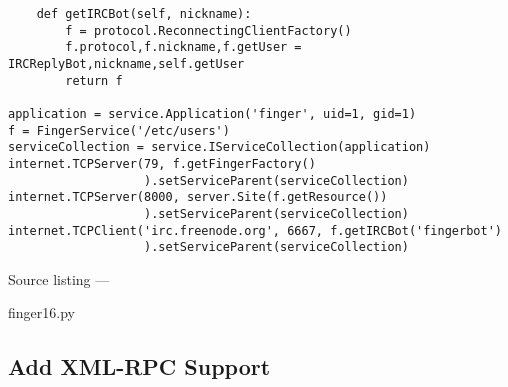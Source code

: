 \begin{verbatim}
    def getIRCBot(self, nickname):
        f = protocol.ReconnectingClientFactory()
        f.protocol,f.nickname,f.getUser = IRCReplyBot,nickname,self.getUser
        return f

application = service.Application('finger', uid=1, gid=1)
f = FingerService('/etc/users')
serviceCollection = service.IServiceCollection(application)
internet.TCPServer(79, f.getFingerFactory()
                   ).setServiceParent(serviceCollection)
internet.TCPServer(8000, server.Site(f.getResource())
                   ).setServiceParent(serviceCollection)
internet.TCPClient('irc.freenode.org', 6667, f.getIRCBot('fingerbot')
                   ).setServiceParent(serviceCollection)
\end{verbatim}\parbox[b]{\linewidth}{\begin{center}Source listing --- \begin{em}finger16.py\end{em}\end{center}}

\subsection{Add XML-RPC Support}


